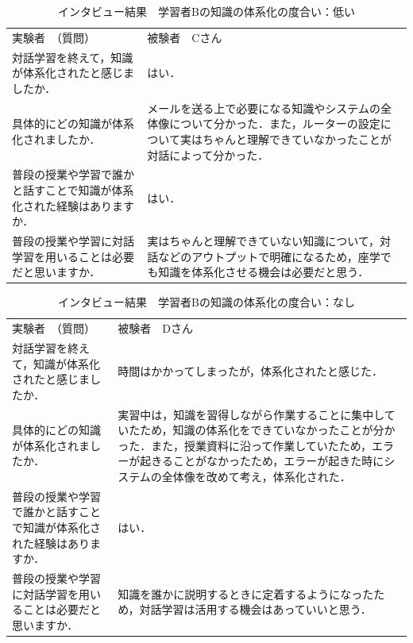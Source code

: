 \documentclass[12pt,a4j,titlepage]{ltjsarticle}
\begin{document}
\clearpage


\begin{table}[htbp]
\begin{center}
\caption{インタビュー結果　学習者Bの知識の体系化の度合い：低い}
\begin{tabular}{|p{8cm}|p{8cm}|}
\cline{1-2}
実験者　（質問）  & 被験者　Cさん   \\ \cline{1-2}
対話学習を終えて，知識が体系化されたと感じましたか．   & はい．       \\ \cline{1-2}
具体的にどの知識が体系化されましたか．                 & メールを送る上で必要になる知識やシステムの全体像について分かった．また，ルーターの設定について実はちゃんと理解できていなかったことが対話によって分かった．   \\ \cline{1-2}
普段の授業や学習で誰かと話すことで知識が体系化された経験はありますか． & はい．         \\ \cline{1-2}
普段の授業や学習に対話学習を用いることは必要だと思いますか．      & 実はちゃんと理解できていない知識について，対話などのアウトプットで明確になるため，座学でも知識を体系化させる機会は必要だと思う．      \\ \cline{1-2}
\end{tabular}
\end{center}
\label{tb:interview}
\end{table}

\clearpage


\begin{table}[htbp]
\begin{center}
\caption{インタビュー結果　学習者Bの知識の体系化の度合い：なし}
\begin{tabular}{|p{8cm}|p{8cm}|}
\cline{1-2}
実験者　（質問）  & 被験者　Dさん   \\ \cline{1-2}
対話学習を終えて，知識が体系化されたと感じましたか．   & 時間はかかってしまったが，体系化されたと感じた．     \\ \cline{1-2}
具体的にどの知識が体系化されましたか．                 & 実習中は，知識を習得しながら作業することに集中していたため，知識の体系化をできていなかったことが分かった．また，授業資料に沿って作業していたため，エラーが起きることがなかったため，エラーが起きた時にシステムの全体像を改めて考え，体系化された．   \\ \cline{1-2}
普段の授業や学習で誰かと話すことで知識が体系化された経験はありますか． & はい．         \\ \cline{1-2}
普段の授業や学習に対話学習を用いることは必要だと思いますか．      & 知識を誰かに説明するときに定着するようになったため，対話学習は活用する機会はあっていいと思う．      \\ \cline{1-2}
\end{tabular}
\end{center}
\label{tb:interview}
\end{table}
\end{document}

